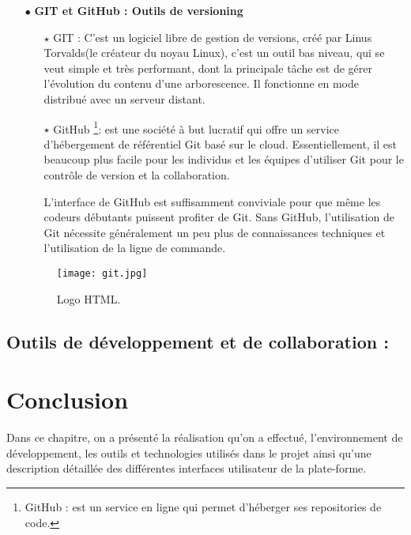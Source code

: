 \begin{itemize}
\medskip	



\item[$\bullet$] \textbf{ GIT et GitHub : Outils de versioning}

	\begin{itemize}	
	\item[$\star$] GIT :  C'est un logiciel libre de gestion de versions, créé par Linus Torvalds(le créateur du noyau Linux), c’est un outil bas niveau, qui se veut simple et très performant, dont la principale tâche est de gérer l’évolution du contenu d’une arborescence. Il fonctionne en mode distribué avec un serveur distant\cite{wiki:git}.
	\item[$\star$] GitHub \footnote{GitHub : est un service en ligne qui permet d'héberger ses repositories de code.}: est une société à but lucratif qui offre un service d’hébergement de référentiel Git basé sur le cloud. Essentiellement, il est beaucoup plus facile pour les individus et les équipes d’utiliser Git pour le contrôle de version et la collaboration.
	
	L’interface de GitHub est suffisamment conviviale pour que même les codeurs débutants puissent profiter de Git. Sans GitHub, l’utilisation de Git nécessite généralement un peu plus de connaissances techniques et l’utilisation de la ligne de commande.

\end{itemize}



\begin{figure}[ht]
	\centering
	\texttt{[image: git.jpg]}
	\caption{Logo HTML.}
	\label{fig:HTML5 }
\end{figure}
\FloatBarrier

\medskip










	
		
\end{itemize}
\subsection{Outils de développement et de collaboration :}




















\clearpage





 


\section{Conclusion}
Dans ce chapitre, on a présenté la réalisation qu'on a effectué, l’environnement de développement, les outils et technologies utilisés dans le projet ainsi qu'une description détaillée des différentes interfaces utilisateur de la plate-forme.



